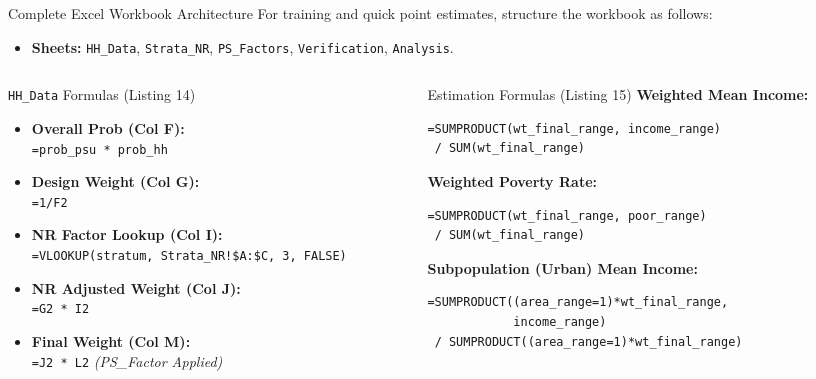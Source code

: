 \documentclass[10pt, aspectratio=169]{beamer}
\begin{document}
\begin{frame}[fragile]{Complete Excel Workbook Architecture}
  For training and quick point estimates, structure the workbook as follows:
  \begin{itemize}
    \item \textbf{Sheets:} \texttt{HH\_Data}, \texttt{Strata\_NR}, \texttt{PS\_Factors}, \texttt{Verification}, \texttt{Analysis}.
  \end{itemize}

  \begin{columns}[T]
    \begin{column}{0.48\textwidth}
      \begin{block}{\texttt{HH\_Data} Formulas (Listing 14)}
        \begin{itemize}
          \item \textbf{Overall Prob (Col F):} \\ \texttt{=prob\_psu * prob\_hh}
          \item \textbf{Design Weight (Col G):} \\ \texttt{=1/F2}
          \item \textbf{NR Factor Lookup (Col I):} \\ \texttt{=VLOOKUP(stratum, Strata\_NR!\$A:\$C, 3, FALSE)}
          \item \textbf{NR Adjusted Weight (Col J):} \\ \texttt{=G2 * I2}
          \item \textbf{Final Weight (Col M):} \\ \texttt{=J2 * L2} \textit{(PS\_Factor Applied)}
        \end{itemize}
      \end{block}
    \end{column}
    \begin{column}{0.48\textwidth}
      \begin{block}{Estimation Formulas (Listing 15)}
        \textbf{Weighted Mean Income:}
        \begin{lstlisting}[backgroundcolor=\color{white}, frame=none, basicstyle=\ttfamily\tiny]
=SUMPRODUCT(wt_final_range, income_range) 
 / SUM(wt_final_range)
        \end{lstlisting}
        \textbf{Weighted Poverty Rate:}
        \begin{lstlisting}[backgroundcolor=\color{white}, frame=none, basicstyle=\ttfamily\tiny]
=SUMPRODUCT(wt_final_range, poor_range) 
 / SUM(wt_final_range)
        \end{lstlisting}
        \textbf{Subpopulation (Urban) Mean Income:}
        \begin{lstlisting}[backgroundcolor=\color{white}, frame=none, basicstyle=\ttfamily\tiny]
=SUMPRODUCT((area_range=1)*wt_final_range, 
            income_range) 
 / SUMPRODUCT((area_range=1)*wt_final_range)
        \end{lstlisting}
      \end{block}
    \end{column}
  \end{columns}
\end{frame}
\end{document}
